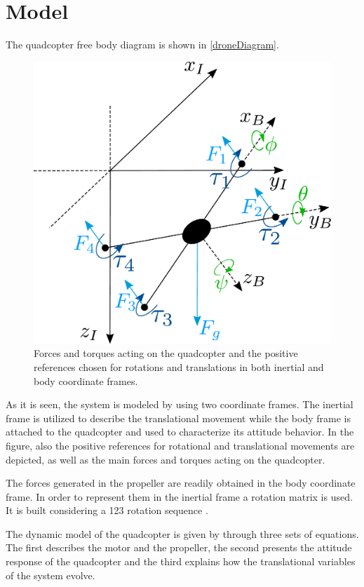 \section{Model}
The quadcopter free body diagram is shown in \autoref{droneDiagram}. 
\begin{figure}[H]
	\centering
	\includegraphics[scale=0.25]{figures/droneDiagram}
	\caption{Forces and torques acting on the quadcopter and the positive references chosen for rotations and translations in both inertial and body coordinate frames.}
	\label{droneDiagram}
\end{figure}
%
As it is seen, the system is modeled by using two coordinate frames. The inertial frame is utilized to describe the translational movement while the body frame is attached to the quadcopter and used to characterize its attitude behavior. In the figure, also the positive references for rotational and translational movements are depicted, as well as the main forces and torques acting on the quadcopter. 

The forces generated in the propeller are readily obtained in the body coordinate frame. In order to represent them in the inertial frame a rotation matrix is used. It is built considering a 123 rotation sequence \cite{rotationmatrix}.
 
The dynamic model of the quadcopter is given by through three sets of equations. The first describes the motor and the propeller, the second presents the attitude response of the quadcopter and the third explains how the translational variables of the system evolve.

